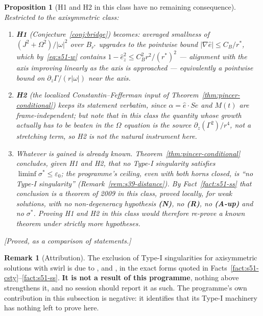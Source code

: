 \documentclass[11pt]{article}
\newtheorem{proposition}[theorem]{Proposition}
\theoremstyle{definition}
\newtheorem{remark}[theorem]{Remark}
\theoremstyle{remark}
\newcommand{\eps}{\varepsilon}
\begin{document}
\begin{proposition}[H1 and H2 in this class have no remaining consequence]
  \label{prop:s51-h1h2-moot}
  Restricted to the axisymmetric class:
  \begin{enumerate}[label=\textup{(\alph*)},leftmargin=2.4em]
  \item \textbf{H1} (Conjecture~\ref{conj:bridge}) becomes: averaged smallness
    of $(J^2+\Omega^2)/|\omega|^2$ over $B_{r^*}$ upgrades to the pointwise
    bound $|\nabla\hat e|\leq C_B/r^*$, which by~\eqref{eq:s51-w} contains
    $1-\hat e_z^2\leq C_B^2r^2/(r^*)^2$ --- alignment with the axis improving
    linearly as the axis is approached --- equivalently a pointwise bound on
    $\partial_z\Gamma/(r|\omega|)$ near the axis.
  \item \textbf{H2} (the localized Constantin--Fefferman input of
    Theorem~\ref{thm:pincer-conditional}) keeps its statement verbatim, since
    $\alpha=\hat e\cdot S\hat e$ and $M(t)$ are frame-independent; but note
    that in this class the quantity whose growth actually has to be beaten in
    the $\Omega$ equation is the source $\partial_z(\Gamma^2)/r^4$, not a
    stretching term, so H2 is not the natural instrument here.
  \item \emph{Whatever is gained is already known.}
    Theorem~\ref{thm:pincer-conditional} concludes, given H1 and H2, that no
    Type-I singularity satisfies $\liminf\sigma^*\leq\eps_0$; the programme's
    ceiling, even with both horns closed, is ``no Type-I singularity''
    (Remark~\ref{rem:s39-distance}). By Fact~\ref{fact:s51-ss} that conclusion
    is a theorem of 2009 in this class, proved locally, for weak solutions,
    with no non-degeneracy hypothesis \textbf{(N)}, no \textbf{(R)}, no
    \textbf{(A-up)} and no $\sigma^*$. \emph{Proving H1 and H2 in this class
    would therefore re-prove a known theorem under strictly more
    hypotheses.}
  \end{enumerate}
  \emph{[Proved, as a comparison of statements.]}
\end{proposition}

\begin{remark}[Attribution]\label{rem:s51-attribution}
  The exclusion of Type-I singularities for axisymmetric solutions with swirl
  is due to \cite{CSTY2008}, \cite{KNSS2009} and \cite{SereginSverak2009}, in
  the exact forms quoted in Facts~\ref{fact:s51-csty}--\ref{fact:s51-ss}.
  \textbf{It is not a result of this programme}, nothing above strengthens it,
  and no session should report it as such. The programme's own contribution in
  this subsection is negative: it identifies that its Type-I machinery has
  nothing left to prove here.
\end{remark}
\end{document}
